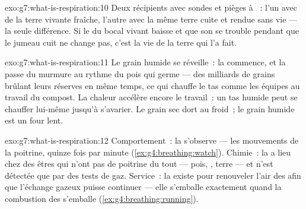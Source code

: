 \begin{solution}{exo:g7:what-is-respiration:10}
Deux récipients avec sondes et pièges à ~: l'un avec de
la terre vivante fraîche, l'autre avec la même terre cuite et rendue
sans vie --- la seule différence. Si le  du bocal vivant
baisse et que son  se trouble pendant que le jumeau cuit
ne change pas, c'est la vie de la terre qui l'a fait.
\end{solution}

\begin{solution}{exo:g7:what-is-respiration:11}
Le grain humide se réveille~: la  commence, et la
 passe du murmure au rythme du pois qui germe --- des
milliards de grains brûlant leurs réserves en même temps, ce qui
chauffe le tas comme les équipes au travail du compost. La chaleur
accélère encore le travail~: un tas humide peut se chauffer
lui-même jusqu'à s'avarier. Le grain sec dort au froid~; le grain
humide est un four lent.
\end{solution}

\begin{solution}{exo:g7:what-is-respiration:12}
Comportement~: la  s'observe --- les mouvements de la
poitrine, quinze fois par minute
(\cref{ex:g4:breathing:watch}). Chimie~: la  a lieu chez
des êtres qui n'ont pas de poitrine du tout --- pois, ,
terre --- et n'est détectée que par des tests de gaz. Service~: la
 existe pour renouveler l'air des  afin que
l'échange gazeux puisse continuer --- elle s'emballe exactement
quand la combustion des  s'emballe
(\cref{ex:g4:breathing:running}).
\end{solution}

